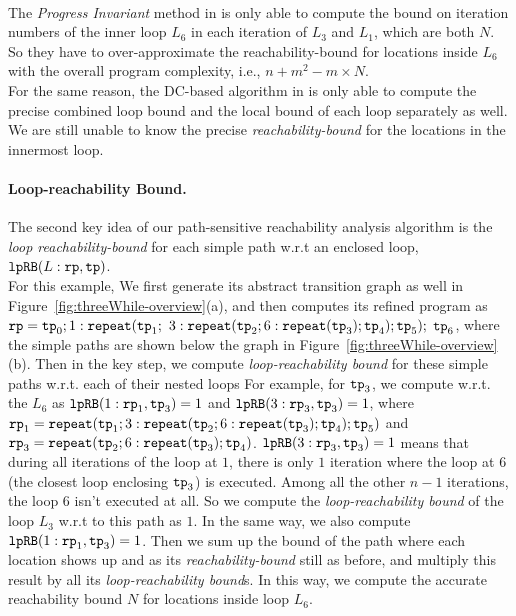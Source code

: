 \\
The \emph{Progress Invariant} method in \cite{GulwaniJK09} is only able to compute
the
bound on iteration numbers
of the inner loop $L_6$ in each iteration of $L_3$ and $L_1$, which are both $N$.
So they have to over-approximate the reachability-bound for locations inside $L_6$ with the
overall program complexity, i.e., $n + m^2 - m \times N$.
\\
For the same reason, the DC-based algorithm in \cite{sinn2017complexity}
is only able to
compute the precise combined loop bound and the local bound of each loop
separately as well.
We are still unable to know the precise \emph{reachability-bound} for the locations in the innermost loop.
\paragraph*{Loop-reachability Bound.}
The second key idea of our path-sensitive reachability analysis algorithm is the
\emph{loop reachability-bound} for each simple path w.r.t an enclosed loop,
$\mathtt{lpRB}(L:\mathtt{rp}, \mathtt{tp})$.
%
\\
For this example, We first generate its abstract transition graph as well in Figure~\ref{fig:threeWhile-overview}(a),
and then computes its refined program as 
$\mathtt{rp} = \mathtt{tp}_0; 1: \mathtt{repeat}(\mathtt{tp}_1;$ 
$3: {\mathtt{repeat}(\mathtt{tp}_2; 6 : {\mathtt{repeat}(\mathtt{tp}_3)}; \mathtt{tp}_4)}; \mathtt{tp}_5);$ 
$\mathtt{tp}_6$,
where the simple paths are shown below the graph in Figure~\ref{fig:threeWhile-overview}(b).
Then in the key step, we compute \emph{loop-reachability bound} for these simple paths w.r.t. each of their nested loops
For example, for $\mathtt{tp}_3$, we compute
w.r.t. the $L_6$ as
$\mathtt{lpRB}(1: \mathtt{rp}_1, \mathtt{tp}_3) = 1$ and
$\mathtt{lpRB}(3: \mathtt{rp}_3, \mathtt{tp}_3) = 1$,
where 
$\mathtt{rp}_1 = {\mathtt{repeat}(\mathtt{tp}_1; 3: {\mathtt{repeat}(\mathtt{tp}_2; 6 : {\mathtt{repeat}(\mathtt{tp}_3)}; \mathtt{tp}_4)}; \mathtt{tp}_5)}$
and
$\mathtt{rp}_3 = {\mathtt{repeat}(\mathtt{tp}_2; 6 : {\mathtt{repeat}(\mathtt{tp}_3)}; \mathtt{tp}_4)}$.
$\mathtt{lpRB}(3: \mathtt{rp}_3, \mathtt{tp}_3) = 1$
means that during all iterations of the loop at $1$, there is only $1$ iteration where the loop at $6$
(the closest loop enclosing $\mathtt{tp}_3$) is executed.
Among all the other $n - 1$ iterations, the loop $6$ isn't executed at all.
So we compute the \emph{loop-reachability bound}  of the loop $L_3$
w.r.t to this path as $1$.
In the same way, we also compute $\mathtt{lpRB}(1: \mathtt{rp}_1, \mathtt{tp}_3) = 1$.
Then we sum up the bound of the path where each location shows up
and as its \emph{reachability-bound} still as before,
and multiply this result by all its \emph{loop-reachability bound}s.
In this way, we compute the accurate reachability bound $N$ for locations inside loop $L_6$.

